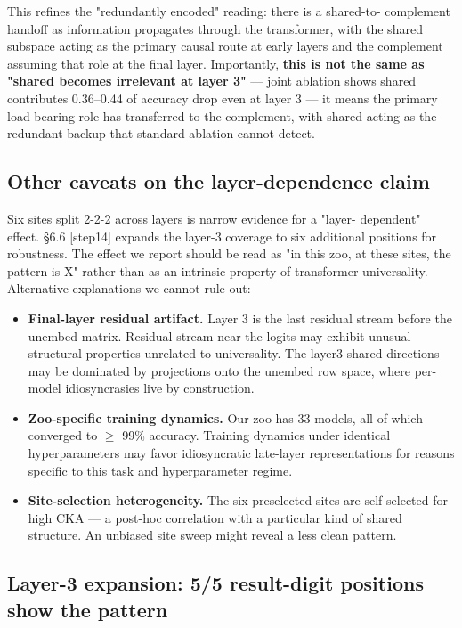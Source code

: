 This refines the "redundantly encoded" reading: there is a shared-to-
complement handoff as information propagates through the transformer,
with the shared subspace acting as the primary causal route at early
layers and the complement assuming that role at the final layer.
Importantly, \textbf{this is not the same as "shared becomes irrelevant at layer 3"} --- joint ablation shows shared contributes 0.36--0.44 of
accuracy drop even at layer 3 --- it means the primary load-bearing role
has transferred to the complement, with shared acting as the redundant
backup that standard ablation cannot detect.

\subsection{Other caveats on the layer-dependence claim}

Six sites split 2-2-2 across layers is narrow evidence for a "layer-
dependent" effect. \S{}6.6 [step14] expands the layer-3 coverage to six
additional positions for robustness. The
effect we report should be read as "in this zoo, at these sites, the
pattern is X" rather than as an intrinsic property of transformer
universality. Alternative explanations we cannot rule out:

\begin{itemize}
  \item \textbf{Final-layer residual artifact.} Layer 3 is the last residual stream before the unembed matrix. Residual stream near the logits may exhibit unusual structural properties unrelated to universality. The layer3 shared directions may be dominated by projections onto the unembed row space, where per-model idiosyncrasies live by construction.
  \item \textbf{Zoo-specific training dynamics.} Our zoo has 33 models, all of which converged to $\geq$ 99\% accuracy. Training dynamics under identical hyperparameters may favor idiosyncratic late-layer representations for reasons specific to this task and hyperparameter regime.
  \item \textbf{Site-selection heterogeneity.} The six preselected sites are self-selected for high CKA --- a post-hoc correlation with a particular kind of shared structure. An unbiased site sweep might reveal a less clean pattern.
\end{itemize}

\subsection{Layer-3 expansion: 5/5 result-digit positions show the pattern}

